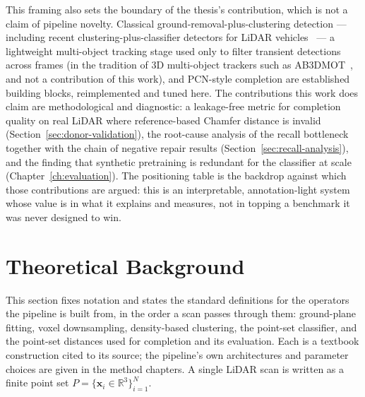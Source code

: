 This framing also sets the boundary of the thesis's contribution, which is not a claim
of pipeline novelty. Classical ground-removal-plus-clustering detection --- including recent
clustering-plus-classifier detectors for LiDAR vehicles~\cite{lim2025longrange} ---
a lightweight multi-object tracking stage used only to filter transient detections
across frames (in the tradition of 3D multi-object trackers such as
AB3DMOT~\cite{weng2020ab3dmot}, and not a contribution of this work), and PCN-style
completion are established building blocks, reimplemented and tuned here. The
contributions this work does claim are methodological and diagnostic: a leakage-free
metric for completion quality on real LiDAR where reference-based Chamfer distance is
invalid (Section~\ref{sec:donor-validation}), the root-cause analysis of the recall bottleneck together with the
chain of negative repair results (Section~\ref{sec:recall-analysis}), and the finding that synthetic
pretraining is redundant for the classifier at scale (Chapter~\ref{ch:evaluation}). The positioning table
is the backdrop against which those contributions are argued: this is an interpretable,
annotation-light system whose value is in what it explains and measures, not in topping a
benchmark it was never designed to win.

\section{Theoretical Background}
\label{sec:bg-theory}

This section fixes notation and states the standard definitions for the operators the
pipeline is built from, in the order a scan passes through them: ground-plane fitting, voxel
downsampling, density-based clustering, the point-set classifier, and the point-set
distances used for completion and its evaluation. Each is a textbook construction cited to
its source; the pipeline's own architectures and parameter choices are given in the method
chapters. A single LiDAR scan is written as a finite point set
$P = \{\mathbf{x}_i \in \mathbb{R}^3\}_{i=1}^{N}$.

